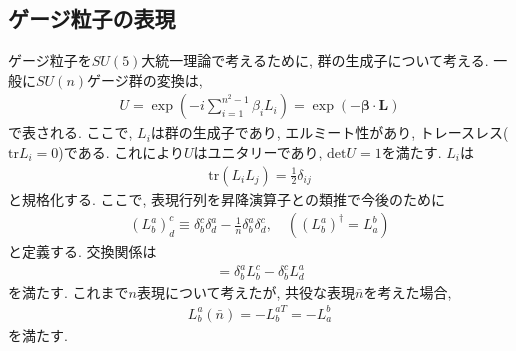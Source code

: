 \documentclass[uplatex,dvipdfmx,a4paper,titlepage]{jsbook}
\theoremstyle{plain}
\theoremstyle{definition}
\begin{document}
{\subsection{ゲージ粒子の表現}
ゲージ粒子を$SU(5)$大統一理論で考えるために, 群の生成子について考える.
一般に$SU(n)$ゲージ群の変換は, 
\begin{align}
  U =\exp\left(-i \sum_{i=1}^{n^2-1}\beta_i L_i\right)=\exp(-\bm{\beta}\cdot \bm{L})
\end{align}
で表される.
ここで, $L_i$は群の生成子であり, エルミート性があり, トレースレス($\mathrm{tr} L_i =0$)である.
これにより$U$はユニタリーであり, $\mathrm{det}U =1$を満たす.
$L_i$は
\begin{align}
  \mathrm{tr}(L_iL_j) = \frac{1}{2}{\delta_{ij}}
\end{align}
と規格化する.
ここで, 表現行列を昇降演算子との類推で今後のために
\begin{align}
  (L^a_b)^c_d \equiv \delta^c_b\delta^a_d -\frac{1}{n}\delta^a_b\delta^c_d,\quad ((L^a_b)^\dagger=L^b_a)
\end{align}
と定義する.
交換関係は
\begin{align}
  [L^a_b,L^c_d] = \delta^a_bL^c_b - \delta^c_bL^a_d
\end{align}
を満たす.
これまで$n$表現について考えたが, 共役な表現$\bar{n}$を考えた場合,
\begin{align}
  L^a_b(\bar{n}) = -L^{aT}_b = -L^b_a
\end{align}
を満たす.

}
\end{document}
